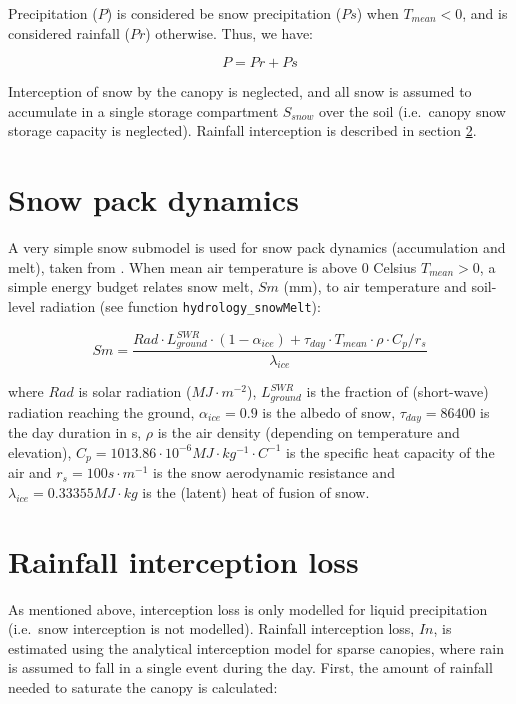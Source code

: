 \documentclass[]{book}
\begin{document}
Precipitation (\(P\)) is considered be snow precipitation (\(Ps\)) when
\(T_{mean}<0\), and is considered rainfall (\(Pr\)) otherwise. Thus, we
have:

\begin{equation}
P = Pr + Ps
\end{equation}

Interception of snow by the canopy is neglected, and all snow is assumed
to accumulate in a single storage compartment \(S_{snow}\) over the soil
(i.e.~canopy snow storage capacity is neglected). Rainfall interception
is described in section \ref{interception}.

\section{Snow pack dynamics}\label{snowpack}

A very simple snow submodel is used for snow pack dynamics (accumulation
and melt), taken from \citet{Kergoat1998}. When mean air temperature is
above 0 Celsius \(T_{mean}>0\), a simple energy budget relates snow
melt, \(Sm\) (mm), to air temperature and soil-level radiation (see
function \texttt{hydrology\_snowMelt}):

\begin{equation}
Sm = \frac{Rad\cdot L^{SWR}_{ground}\cdot (1-\alpha_{ice}) + \tau_{day} \cdot T_{mean} \cdot \rho \cdot C_p/r_{s}}{\lambda_{ice}}
\end{equation}

where \(Rad\) is solar radiation (\(MJ \cdot m^{-2}\)),
\(L^{SWR}_{ground}\) is the fraction of (short-wave) radiation reaching
the ground, \(\alpha_{ice} = 0.9\) is the albedo of snow,
\(\tau_{day} = 86400\) is the day duration in s, \(\rho\) is the air
density (depending on temperature and elevation),
\(C_{p} = 1013.86 \cdot 10^{-6} MJ \cdot kg^{-1} \cdot C^{-1}\) is the
specific heat capacity of the air and \(r_{s} = 100 s \cdot m^{-1}\) is
the snow aerodynamic resistance and
\(\lambda_{ice} = 0.33355 MJ \cdot kg\) is the (latent) heat of fusion
of snow.

\section{Rainfall interception loss}\label{interception}

As mentioned above, interception loss is only modelled for liquid
precipitation (i.e.~snow interception is not modelled). Rainfall
interception loss, \(In\), is estimated using the \citet{Gash1995}
analytical interception model for sparse canopies, where rain is assumed
to fall in a single event during the day. First, the amount of rainfall
needed to saturate the canopy is calculated:
\end{document}
